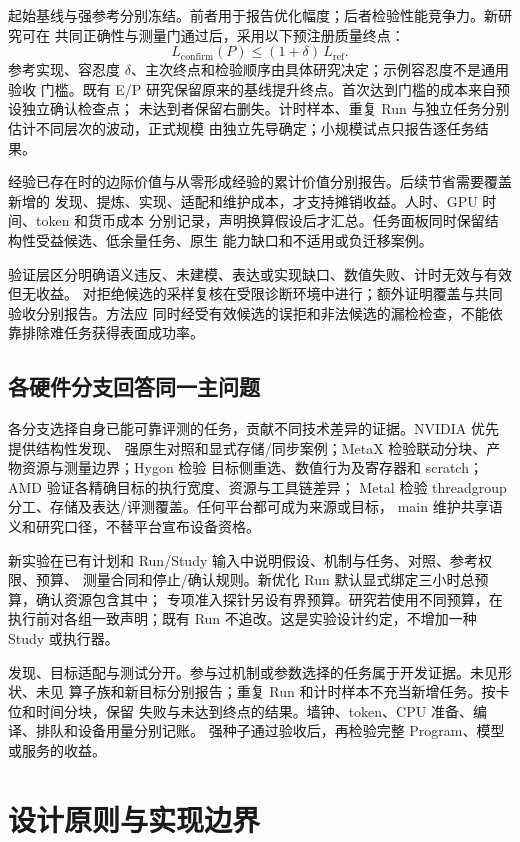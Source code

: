\documentclass[UTF8,11pt,a4paper,fontset=none]{ctexart}
\begin{document}
起始基线与强参考分别冻结。前者用于报告优化幅度；后者检验性能竞争力。新研究可在
共同正确性与测量门通过后，采用以下预注册质量终点：
\[
  L_{\mathrm{confirm}}(P) \leq (1+\delta)\,L_{\mathrm{ref}}.
\]
参考实现、容忍度 $\delta$、主次终点和检验顺序由具体研究决定；示例容忍度不是通用验收
门槛。既有 E/P 研究保留原来的基线提升终点。首次达到门槛的成本来自预设独立确认检查点；
未达到者保留右删失。计时样本、重复 Run 与独立任务分别估计不同层次的波动，正式规模
由独立先导确定；小规模试点只报告逐任务结果。

经验已存在时的边际价值与从零形成经验的累计价值分别报告。后续节省需要覆盖新增的
发现、提炼、实现、适配和维护成本，才支持摊销收益。人时、GPU 时间、token 和货币成本
分别记录，声明换算假设后才汇总。任务面板同时保留结构性受益候选、低余量任务、原生
能力缺口和不适用或负迁移案例。

验证层区分明确语义违反、未建模、表达或实现缺口、数值失败、计时无效与有效但无收益。
对拒绝候选的采样复核在受限诊断环境中进行；额外证明覆盖与共同验收分别报告。方法应
同时经受有效候选的误拒和非法候选的漏检检查，不能依靠排除难任务获得表面成功率。

\subsection{各硬件分支回答同一主问题}
各分支选择自身已能可靠评测的任务，贡献不同技术差异的证据。NVIDIA 优先提供结构性发现、
强原生对照和显式存储/同步案例；MetaX 检验联动分块、产物资源与测量边界；Hygon 检验
目标侧重选、数值行为及寄存器和 scratch；AMD 验证各精确目标的执行宽度、资源与工具链差异；
Metal 检验 threadgroup 分工、存储及表达/评测覆盖。任何平台都可成为来源或目标，
main 维护共享语义和研究口径，不替平台宣布设备资格。

新实验在已有计划和 Run/Study 输入中说明假设、机制与任务、对照、参考权限、预算、
测量合同和停止/确认规则。新优化 Run 默认显式绑定三小时总预算，确认资源包含其中；
专项准入探针另设有界预算。研究若使用不同预算，在执行前对各组一致声明；既有 Run
不追改。这是实验设计约定，不增加一种 Study 或执行器。

发现、目标适配与测试分开。参与过机制或参数选择的任务属于开发证据。未见形状、未见
算子族和新目标分别报告；重复 Run 和计时样本不充当新增任务。按卡位和时间分块，保留
失败与未达到终点的结果。墙钟、token、CPU 准备、编译、排队和设备用量分别记账。
强种子通过验收后，再检验完整 Program、模型或服务的收益。


\section{设计原则与实现边界}
\end{document}

